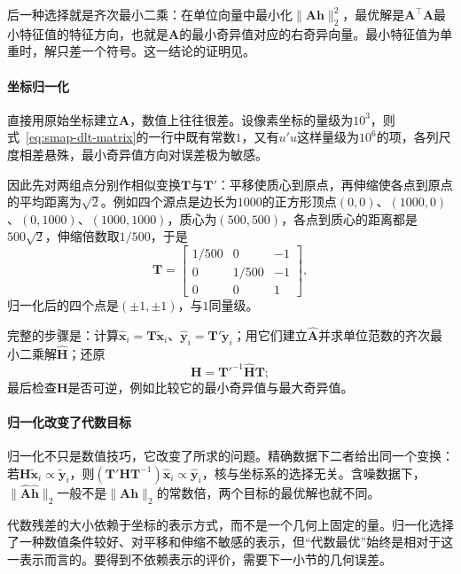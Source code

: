 后一种选择就是齐次最小二乘：在单位向量中最小化$\lVert\bm A\bm h\rVert_2^2$，最优解是$\bm A^\top\bm A$最小特征值的特征方向，也就是$\bm A$的最小奇异值对应的右奇异向量。最小特征值为单重时，解只差一个符号。这一结论的证明见。

\paragraph{坐标归一化}

直接用原始坐标建立$\bm A$，数值上往往很差。设像素坐标的量级为$10^3$，则式~\eqref{eq:smap-dlt-matrix}的一行中既有常数$1$，又有$u'u$这样量级为$10^6$的项，各列尺度相差悬殊，最小奇异值方向对误差极为敏感。

因此先对两组点分别作相似变换$\bm T$与$\bm T'$：平移使质心到原点，再伸缩使各点到原点的平均距离为$\sqrt2$。例如四个源点是边长为$1000$的正方形顶点$(0,0)$、$(1000,0)$、$(0,1000)$、$(1000,1000)$，质心为$(500,500)$，各点到质心的距离都是$500\sqrt2$，伸缩倍数取$1/500$，于是
\[
 \bm T=\begin{bmatrix}1/500&0&-1\\0&1/500&-1\\0&0&1\end{bmatrix},
\]
归一化后的四个点是$(\pm1,\pm1)$，与$1$同量级。

完整的步骤是：计算$\widehat{\bm x}_i=\bm T\widetilde{\bm x}_i$、$\widehat{\bm y}_i=\bm T'\widetilde{\bm y}_i$；用它们建立$\widehat{\bm A}$并求单位范数的齐次最小二乘解$\widehat{\bm H}$；还原
\begin{equation}
 \bm H=\bm T'^{-1}\widehat{\bm H}\bm T ;
 \label{eq:smap-denormalize}
\end{equation}
最后检查$\bm H$是否可逆，例如比较它的最小奇异值与最大奇异值。

\paragraph{归一化改变了代数目标}

归一化不只是数值技巧，它改变了所求的问题。精确数据下二者给出同一个变换：若$\bm H\widetilde{\bm x}_i\propto\widetilde{\bm y}_i$，则$(\bm T'\bm H\bm T^{-1})\widehat{\bm x}_i\propto\widehat{\bm y}_i$，核与坐标系的选择无关。含噪数据下，$\lVert\widehat{\bm A}\widehat{\bm h}\rVert_2$一般不是$\lVert\bm A\bm h\rVert_2$的常数倍，两个目标的最优解也就不同。

代数残差的大小依赖于坐标的表示方式，而不是一个几何上固定的量。归一化选择了一种数值条件较好、对平移和伸缩不敏感的表示，但“代数最优”始终是相对于这一表示而言的。要得到不依赖表示的评价，需要下一小节的几何误差。

